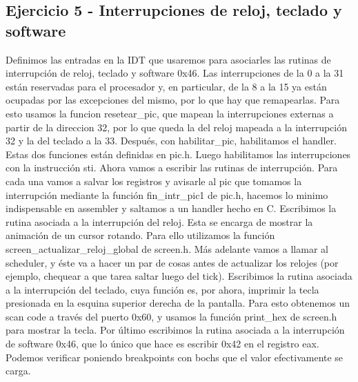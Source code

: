 \documentclass[10pt,a4paper,spanish]{article}
\begin{document}
\subsection{Ejercicio 5 - Interrupciones de reloj, teclado y software}
Definimos las entradas en la IDT que usaremos para asociarles las rutinas de interrupción de reloj, teclado y software 0x46.
Las interrupciones de la 0 a la 31 están reservadas para el procesador y, en particular, de la 8 a la 15 ya están ocupadas por las excepciones del mismo, por lo que hay que remapearlas. Para esto usamos la funcion resetear_pic, que mapean la interrupciones externas a partir de la direccion 32, por lo que queda la del reloj mapeada a la interrupción 32 y  la del teclado a la 33. Después, con habilitar_pic, habilitamos el handler. Estas dos funciones están definidas en pic.h.
Luego habilitamos las interrupciones con la instrucción sti.
Ahora vamos a escribir las rutinas de interrupción. Para cada una vamos a salvar los registros y avisarle al pic que tomamos la interrupción mediante la función fin_intr_pic1 de pic.h, hacemos lo minimo indispensable en assembler y saltamos a un handler hecho en C.
Escribimos la rutina asociada a la interrupción del reloj. Esta se encarga de mostrar la animación de un cursor rotando. Para ello utilizamos la función screen_actualizar_reloj_global de screen.h. Más adelante vamos a llamar al scheduler, y éste va a hacer un par de cosas antes de actualizar los relojes (por ejemplo, chequear a que tarea saltar luego del tick).
Escribimos la rutina asociada a la interrupción del teclado, cuya función es, por ahora, imprimir la tecla presionada en la esquina superior derecha de la pantalla. Para esto obtenemos un scan code a través del puerto 0x60, y usamos la función print_hex de screen.h para mostrar la tecla.
Por último escribimos la rutina asociada a la interrupción de software 0x46, que lo único que hace es escribir 0x42 en el registro eax. Podemos verificar poniendo breakpoints con bochs que el valor efectivamente se carga.
\end{document}
